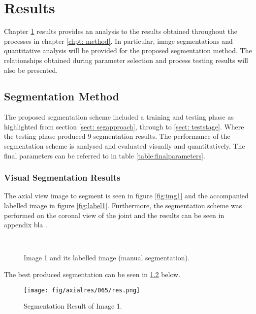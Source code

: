 \chapter{Results}
\label{chpt: results}
Chapter \ref{chpt: results} results provides an analysis to the results obtained throughout the processes in chapter \ref{chpt: method}. In particular, image segmentations and quantitative analysis  will be provided for the proposed segmentation method. The relationships obtained during parameter selection and process testing results will also be presented. 

\section{Segmentation Method}
The proposed segmentation scheme included a training and testing phase as highlighted from section \ref{sect: segapproach}, through to \ref{sect: teststage}. Where the testing phase produced 9 segmentation results. The performance of the segmentation scheme is analysed and evaluated visually and quantitatively. The final parameters can be referred to in table \ref{table:finalparameters}.

\subsection{Visual Segmentation Results}
The axial view image to segment is seen in figure \ref{fig:img1} and the accompanied labelled image in figure \ref{fig:label1}. Furthermore, the segmentation scheme was performed on the coronal view of the joint and the results can be seen in appendix bla .

\begin{figure}[H]
    \centering
    \\
    \caption{Image 1 and its labelled image (manual segmentation).}%
    \label{fig:image1}
\end{figure}

The best produced segmentation can be seen in \ref{fig:res1} below.

\begin{figure}[H]
\centering
\texttt{[image: fig/axialres/065/res.png]}
\caption{Segmentation Result of Image 1.}
\label{fig:res1}
\end{figure}


